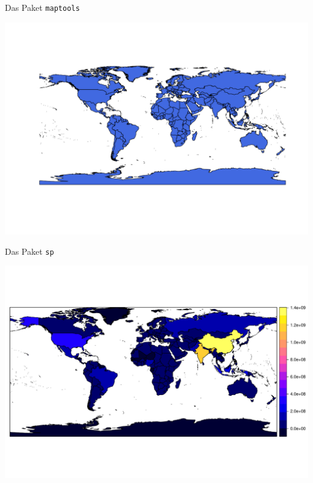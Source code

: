 \begin{frame}[fragile]{Das Paket \texttt{maptools}}

\begin{Shaded}
\begin{Highlighting}[]
\NormalTok{)}
\end{Highlighting}
\end{Shaded}

\includegraphics{ps_user_stuttgart_part3_files/figure-beamer/unnamed-chunk-7-1.pdf}

\end{frame}

\begin{frame}[fragile]{Das Paket \texttt{sp}}

\begin{Shaded}
\begin{Highlighting}[]
\NormalTok{)}
\end{Highlighting}
\end{Shaded}

\includegraphics{ps_user_stuttgart_part3_files/figure-beamer/unnamed-chunk-8-1.pdf}

\end{frame}

